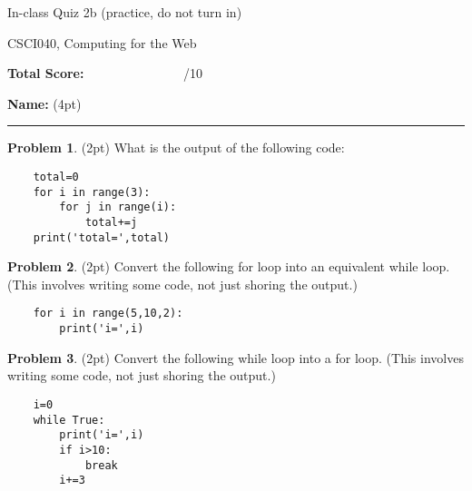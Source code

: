 \documentclass[10pt]{article}
\theoremstyle{definition}
\newtheorem{problem}{Problem}
\begin{document}
\begin{center}
    {
\Large
In-class Quiz 2b (practice, do not turn in)
}

    \vspace{0.1in}
CSCI040, Computing for the Web

    \vspace{0.1in}
\end{center}

\vspace{0.25in}
\noindent
\textbf{Total Score:} ~~~~~~~~~~~~~~~/10

\vspace{0.5in}
\noindent
\textbf{Name:} (4pt)

\noindent
\rule{\textwidth}{0.1pt}
\vspace{0.25in}

\begin{problem}
    (2pt)
    What is the output of the following code:
\end{problem}
\begin{lstlisting}
    total=0
    for i in range(3):
        for j in range(i):
            total+=j
    print('total=',total)
\end{lstlisting}
\vspace{2in}

\newpage
\begin{problem}
    (2pt)
    Convert the following for loop into an equivalent while loop.
    (This involves writing some code, not just shoring the output.)
\end{problem}
\begin{lstlisting}
    for i in range(5,10,2):
        print('i=',i)
\end{lstlisting}
\vspace{3.5in}

\begin{problem}
    (2pt)
    Convert the following while loop into a for loop.
    (This involves writing some code, not just shoring the output.)
\end{problem}
\begin{lstlisting}
    i=0
    while True:
        print('i=',i)
        if i>10:
            break
        i+=3
\end{lstlisting}
\vspace{1.5in}
\end{document}
